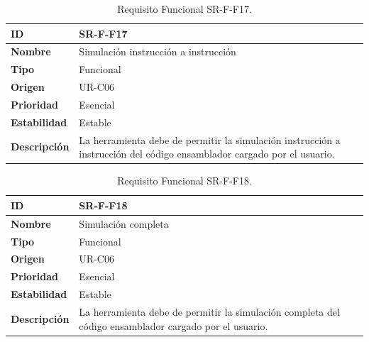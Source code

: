 \begin{center}
\begin{table}[htbp]
\centering
\begin{tabular}{@{}p{2.5cm} p{9cm}@{}} 
\toprule
\textbf{ID} 				& SR-F-F17 \\
\midrule
\textbf{Nombre} 			& Simulación instrucción a instrucción\\
\midrule
\textbf{Tipo} 			& Funcional \\
\midrule
\textbf{Origen} 			& UR-C06 \\
\midrule
\textbf{Prioridad}		& Esencial \\
\midrule
\textbf{Estabilidad} 		& Estable \\
\midrule
\textbf{Descripción} 	& La herramienta debe de permitir la simulación instrucción a instrucción del código ensamblador cargado por el usuario. \\
\bottomrule
\end{tabular}
\caption{Requisito Funcional SR-F-F17.}
\label{tab:srff17}
\end{table}
\end{center}

\begin{center}
\begin{table}[htbp]
\centering
\begin{tabular}{@{}p{2.5cm} p{9cm}@{}} 
\toprule
\textbf{ID} 				& SR-F-F18 \\
\midrule
\textbf{Nombre} 			& Simulación completa\\
\midrule
\textbf{Tipo} 			& Funcional \\
\midrule
\textbf{Origen} 			& UR-C06 \\
\midrule
\textbf{Prioridad}		& Esencial \\
\midrule
\textbf{Estabilidad} 		& Estable \\
\midrule
\textbf{Descripción} 	& La herramienta debe de permitir la simulación completa del código ensamblador cargado por el usuario. \\
\bottomrule
\end{tabular}
\caption{Requisito Funcional SR-F-F18.}
\label{tab:srff18}
\end{table}
\end{center}

